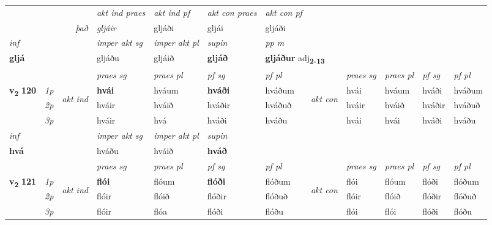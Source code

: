 \begin{longtable}[l]{X>{\footnotesize\itshape}llXXXXlXXXX}
   && &  \textit{akt ind praes} & \textit{akt ind pf} & \textit{akt con praes} & \textit{akt con pf} \\*
\multicolumn{3}{r}{\textit{það}} & gljáir & gljáði & gljái & gljáði \\*

\cmidrule{4-7}
   {\textit{inf}} & &  & \textit{imper akt sg} & \textit{imper akt pl}    & \textit{supin}  & \textit{pp m} \\*
  {\textbf{gljá}} & && gljáðu  & gljáið    &  \textbf{gljáð}  & \multicolumn{2}{l}{\textbf{gljáður} adj\textbf{\textsubscript{2-13}}} \\*

\midrule

 & &   & \textit{praes sg}  & \textit{praes pl}    & \textit{ pf sg} & \textit{pf pl} & & \textit{praes sg}  & \textit{praes pl}    & \textit{pf sg} & \textit{pf pl }  \\ \cmidrule{4-7} \cmidrule{9-12}
 \multirow{2}{*}{{{\textbf{v{\textsubscript{2}}} \Large{\textbf{120}}}}}  & 1p & \multirow{3}{*}{\begin{turn}{90}\textit{akt ind}\end{turn}} & \textbf{hvái} & hváum & \textbf{hváði} & hváðum & \multirow{3}{*}{\begin{turn}{90}\textit{akt con}\end{turn}} &hvái & hváum & hváði & hváðum\\*
 & 2p &  &  hváir  & hváið & hváðir & hváðuð & & hváir & hváið & hváðir & hváðuð \\*
 & 3p &  & hváir & hvá & hváði & hváðu & & hvái & hvái& hváði & hváðu \\*
\cmidrule{4-7} \cmidrule{9-12}

   {\textit{inf}} & &  & \textit{imper akt sg} & \textit{imper akt pl}    & \textit{supin}   \\*
  {\textbf{hvá}} & && hváðu  & hváið    &  \textbf{hváð}   \\*

\midrule

 & &   & \textit{praes sg}  & \textit{praes pl}    & \textit{ pf sg} & \textit{pf pl} & & \textit{praes sg}  & \textit{praes pl}    & \textit{pf sg} & \textit{pf pl }  \\ \cmidrule{4-7} \cmidrule{9-12}
 \multirow{2}{*}{{{\textbf{v{\textsubscript{2}}} \Large{\textbf{121}}}}}  & 1p & \multirow{3}{*}{\begin{turn}{90}\textit{akt ind}\end{turn}} & \textbf{flói} & flóum & \textbf{flóði} & flóðum & \multirow{3}{*}{\begin{turn}{90}\textit{akt con}\end{turn}} &flói & flóum & flóði & flóðum\\*
 & 2p &  &  flóir  & flóið & flóðir & flóðuð & & flóir & flóið & flóðir & flóðuð \\*
 & 3p &  & flóir & flóa & flóði & flóðu & & flói & flói& flóði & flóðu \\*
\cmidrule{4-7} \cmidrule{9-12}


\end{longtable}
